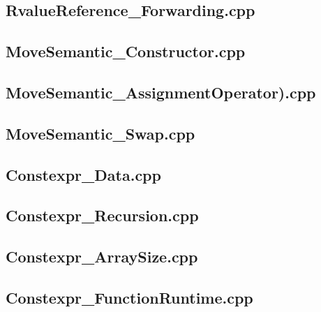 \documentclass[11pt]{report}
\begin{document}
\begin{appendix}
\subsection{RvalueReference\_Forwarding.cpp}
\label{RvalueReference_Forwarding}


\subsection{MoveSemantic\_Constructor.cpp}
\label{MoveSemantic_Constructor}


\subsection{MoveSemantic\_AssignmentOperator).cpp}
\label{MoveSemantic_AssignmentOperator}


\subsection{MoveSemantic\_Swap.cpp}
\label{MoveSemantic_Swap}


\subsection{Constexpr\_Data.cpp}
\label{Constexpr_Data}


\subsection{Constexpr\_Recursion.cpp}
\label{Constexpr_Recursion}


\subsection{Constexpr\_ArraySize.cpp}
\label{Constexpr_ArraySize}


\subsection{Constexpr\_FunctionRuntime.cpp}
\label{Constexpr_FunctionRuntime}



\end{appendix}
\end{document}
